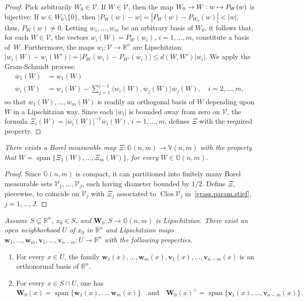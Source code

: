 \documentclass[JEP,XML,SOM,Unicode,ThmDefs,NoEqCountersInSection]{cedram}
\newcommand\mto{\mathchoice{\longmapsto}{\mapsto}{\mapsto}{\mapsto}}
\newcommand{\quand}{\quad\text{and}\quad}
\newenvironment{Empty}[2][\null]{%
\begin{enonce}[remark]{#1}#2}
{\end{enonce}}
\newcommand{\R}{\mathbb{R}}
\newcommand{\Rn}{\R^n}
\newcommand{\calV}{\mathscr{V}}
\newcommand{\bW}{{\boldsymbol{W}}}
\newcommand{\bv}{{\boldsymbol{v}}}
\newcommand{\bw}{{\boldsymbol{w}}}
\newcommand{\bV}{\mathbb{V}}
\newcommand{\bG}{\mathbb{G}}
\DeclareMathOperator{\rmClos}{\mathrm{Clos}}
\DeclareMathOperator{\rmspan}{\mathrm{span}}
\let\la\langle
\let\ra\rangle
\let\subset\subseteq
\begin{document}
\begin{proof}
Pick arbitrarily $W_0 \in \calV$.
If $W \in \calV$, then the map $W_0 \to W: w \mto P_W(w)$ is bijective: If $w \in W_0 \setminus \{0\}$, then $\left|P_W(w)-w\right| = \left|P_W(w)-P_{W_0}(w)\right| < |w|$, thus, $P_W(w) \neq 0$.
Letting $w_1,\ldots,w_m$ be an arbitrary basis of $W_0$, it follows that, for each $W \in \calV$, the vectors $w_i(W) = P_W(w_i)$, $i=1,\ldots,m$, constitute a basis of~$W$.
Furthermore, the maps $w_i: \calV \to \Rn$ are Lipschitzian: $\left| w_i(W)-w_i(W')\right| = \left|P_W(w_i) - P_{W'}(w_i)\right| \leq d(W,W') |w_i|$.
We apply the Gram-Schmidt process:
\begin{align*}
\overline{w}_1(W) &= w_1(W)\\[-5pt]
\tag*{and} \overline{w}_i(W) &= w_i(W) - \sum_{j=1}^{i-1} \la w_i(W), \overline{w}_j(W) \ra \overline{w}_j(W),\quad i=2,\ldots,m,
\end{align*}
so that $\overline{w}_1(W),\ldots,\overline{w}_m(W)$ is readily an orthogonal basis of $W$ depending upon $W$ in a Lipschitzian way.
Since each $\left|\overline{w}_i\right|$ is bounded away from zero on $\calV$, the formula $\Xi_i(W) = \left|\overline{w}_i(W)\right|^{-1}\overline{w}_i(W)$, $i=1,\ldots,m$, defines $\Xi$ with the required property.
\end{proof}

\begin{Empty}[]
\label{grass.param.stief.borel}
{\it
There exists a Borel measurable map $\Xi: \bG(n,m) \to \bV(n,m)$ with the property that $W = \rmspan \{ \Xi_1(W),\ldots,\Xi_m(W)\}$, for every $W \in \bG(n,m)$.
}
\end{Empty}

\begin{proof}
Since $\bG(n,m)$ is compact, it can partitioned into finitely many Borel measurable sets $\calV_1,\ldots,\calV_J$, each having diameter bounded by $1/2$.
Define $\Xi$, piecewise, to coincide on $\calV_j$ with $\Xi_j$ associated to $\rmClos \calV_j$ in~\ref{grass.param.stief}, $j=1,\ldots,J$.
\end{proof}

\begin{Empty}[]
\label{orth.frame}
{\it
Assume $S \subset \Rn$, $x_0 \in S$, and $\bW_0: S \to \bG(n,m)$ is Lipschitzian. There exist an open neighborhood $U$ of $x_0$ in $\Rn$ and Lipschitzian maps $\bw_1,\ldots,\bw_m,\bv_1,\ldots,\bv_{n-m}\!: U \to \Rn$ with the following properties.
\begin{enumerate}
\item For every $x \in U$, the family $\bw_1(x),\ldots,\bw_m(x),\bv_1(x),\ldots,\bv_{n-m}(x)$ is an ortho\-normal basis of $\Rn$.
\item For every $x \in S \cap U$, one has
\begin{equation*}
\bW_0(x) = \rmspan \{ \bw_1(x),\ldots,\bw_m(x) \}
\quand
\bW_0(x)^\perp = \rmspan \{ \bv_1(x),\ldots,\bv_{n-m}(x) \}.
\end{equation*}
\end{enumerate}
}
\end{Empty}
\end{document}

